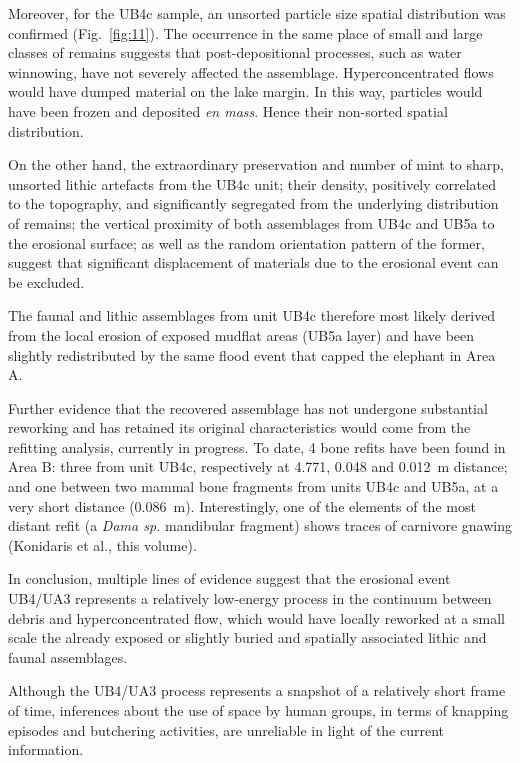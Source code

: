 \documentclass[review,authoryear,times]{elsarticle} %
\begin{document}
Moreover, for the UB4c sample, an unsorted particle size spatial distribution was confirmed (Fig.~\ref{fig:11}). The occurrence in the same place of small and large classes of remains suggests that post-depositional processes, such as water winnowing, have not severely affected the assemblage. Hyperconcentrated flows would have dumped material on the lake margin. In this way, particles would have been frozen and deposited \emph{en mass}. Hence their non-sorted spatial distribution.

On the other hand, the extraordinary preservation and number of mint to sharp, unsorted lithic artefacts from the UB4c unit; their density, positively correlated to the topography, and significantly segregated from the underlying distribution of remains; the vertical proximity of both assemblages from UB4c and UB5a to the erosional surface; as well as the random orientation pattern of the former, suggest that significant displacement of materials due to the erosional event can be excluded.

The faunal and lithic assemblages from unit UB4c therefore most likely derived from the local erosion of exposed mudflat areas (UB5a layer) and have been slightly redistributed by the same flood event that capped the elephant in Area A.

Further evidence that the recovered assemblage has not undergone substantial reworking and has retained its original characteristics would come from the refitting analysis, currently in progress. To date, 4 bone refits have been found in Area B: three from unit UB4c, respectively at 4.771, 0.048 and 0.012~m distance; and one between two mammal bone fragments from units UB4c and UB5a, at a very short distance (0.086~m). Interestingly, one of the elements of the most distant refit (a \emph{Dama sp.} mandibular fragment) shows traces of carnivore gnawing (Konidaris et al., this volume).

In conclusion, multiple lines of evidence suggest that the erosional event UB4/UA3 represents a relatively low-energy process in the continuum between debris and hyperconcentrated flow, which would have locally reworked at a small scale the already exposed or slightly buried and spatially associated lithic and faunal assemblages.

Although the UB4/UA3 process represents a snapshot of a relatively short frame of time, inferences about the use of space by human groups, in terms of knapping episodes and butchering activities, are unreliable in light of the current information.
\end{document}
